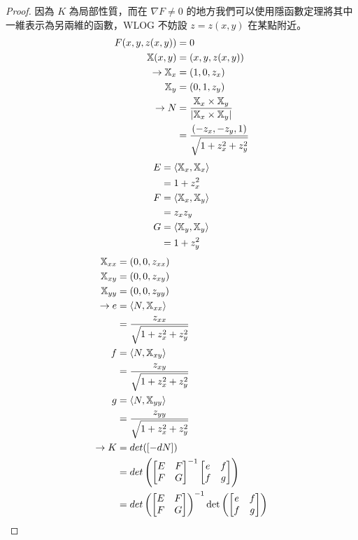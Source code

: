 \documentclass[10pt,a4paper]{article}
\begin{document}
\begin{proof}
因為 $K$ 為局部性質，而在 $\nabla F\neq 0$ 的地方我們可以使用隱函數定理將其中一維表示為另兩維的函數，WLOG 不妨設 $z=z(x,y)$ 在某點附近。\\
\begin{align*}
F(x,y,z(x,y))&=0\\
\mathbb{X}(x,y)&=(x,y,z(x,y))\\
\rightarrow \mathbb{X}_x&=(1,0,z_x)\\
\mathbb{X}_y&=(0,1,z_y)\\
\rightarrow N&=\frac{\mathbb{X}_x\times\mathbb{X}_y}{|\mathbb{X}_x\times\mathbb{X}_y|}\\
&=\frac{(-z_x,-z_y,1)}{\sqrt{1+z_x^2+z_y^2}}\\
\end{align*}
\begin{align*}
E&=\langle\mathbb{X}_x, \mathbb{X}_x\rangle\\
&=1+z_x^2\\
F&=\langle\mathbb{X}_x, \mathbb{X}_y\rangle\\
&=z_xz_y\\
G&=\langle\mathbb{X}_y, \mathbb{X}_y\rangle\\
&=1+z_y^2\\
\end{align*}
\begin{align*}
\bx_{xx}&=(0,0,z_{xx})\\
\bx_{xy}&=(0,0,z_{xy})\\
\bx_{yy}&=(0,0,z_{yy})\\
\rightarrow e&=\langle N, \bx_{xx}\rangle\\
&=\frac{z_{xx}}{\sqrt{1+z_x^2+z_y^2}}\\
f&=\langle N, \bx_{xy}\rangle\\
&=\frac{z_{xy}}{\sqrt{1+z_x^2+z_y^2}}\\
g&=\langle N, \bx_{yy}\rangle\\
&=\frac{z_{yy}}{\sqrt{1+z_x^2+z_y^2}}\\
\rightarrow K&=det([-dN])\\
&=det\left(\begin{bmatrix}E&F\\F&G\end{bmatrix}^{-1}\begin{bmatrix}e&f\\f&g\end{bmatrix}\right)\\
&=det\left(\begin{bmatrix}E&F\\F&G\end{bmatrix}\right)^{-1}\det\left(\begin{bmatrix}e&f\\f&g\end{bmatrix}\right)\\

\end{align*}
\end{proof}
\end{document}
